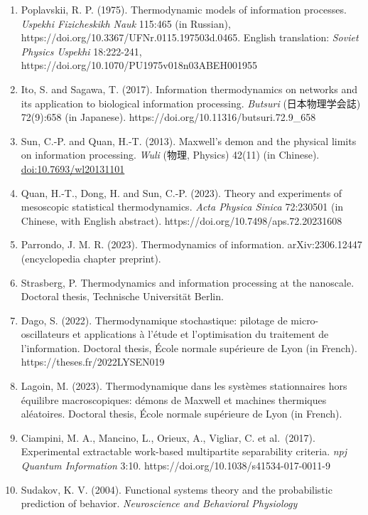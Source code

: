 \documentclass[
  10pt,
]{article}
\begin{document}
\begin{enumerate}
  evolutionary driver. \emph{Complexity} 16:27-40.
  https://doi.org/10.1002/cplx.20323
\item
  Poplavskii, R. P. (1975). Thermodynamic models of information
  processes. \emph{Uspekhi Fizicheskikh Nauk} 115:465 (in Russian),
  https://doi.org/10.3367/UFNr.0115.197503d.0465. English translation:
  \emph{Soviet Physics Uspekhi} 18:222-241,
  https://doi.org/10.1070/PU1975v018n03ABEH001955
\item
  Ito, S. and Sagawa, T. (2017). Information thermodynamics on networks
  and its application to biological information processing.
  \emph{Butsuri} (日本物理学会誌) 72(9):658 (in Japanese).
  https://doi.org/10.11316/butsuri.72.9\_658
\item
  Sun, C.-P. and Quan, H.-T. (2013). Maxwell's demon and the physical
  limits on information processing. \emph{Wuli} (物理, Physics) 42(11)
  (in Chinese).
  \href{https://doi.org/10.7693/wl20131101}{doi:10.7693/wl20131101}
\item
  Quan, H.-T., Dong, H. and Sun, C.-P. (2023). Theory and experiments of
  mesoscopic statistical thermodynamics. \emph{Acta Physica Sinica}
  72:230501 (in Chinese, with English abstract).
  https://doi.org/10.7498/aps.72.20231608
\item
  Parrondo, J. M. R. (2023). Thermodynamics of information.
  arXiv:2306.12447 (encyclopedia chapter preprint).
\item
  Strasberg, P. Thermodynamics and information processing at the
  nanoscale. Doctoral thesis, Technische Universität Berlin.
\item
  Dago, S. (2022). Thermodynamique stochastique: pilotage de
  micro-oscillateurs et applications à l'étude et l'optimisation du
  traitement de l'information. Doctoral thesis, École normale supérieure
  de Lyon (in French). https://theses.fr/2022LYSEN019
\item
  Lagoin, M. (2023). Thermodynamique dans les systèmes stationnaires
  hors équilibre macroscopiques: démons de Maxwell et machines
  thermiques aléatoires. Doctoral thesis, École normale supérieure de
  Lyon (in French).
\item
  Ciampini, M. A., Mancino, L., Orieux, A., Vigliar, C. et al.~(2017).
  Experimental extractable work-based multipartite separability
  criteria. \emph{npj Quantum Information} 3:10.
  https://doi.org/10.1038/s41534-017-0011-9
\item
  Sudakov, K. V. (2004). Functional systems theory and the probabilistic
  prediction of behavior. \emph{Neuroscience and Behavioral Physiology}

\end{enumerate}
\end{document}
